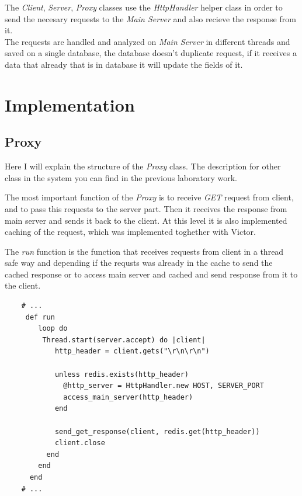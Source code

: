 \documentclass[12pt]{article}
\begin{document}
    The \textit{Client}, \textit{Server}, \textit{Proxy} classes use the \textit{HttpHandler} helper class in order to
    send the necesary requests to the \textit{Main Server} and also recieve the response from it. \\ 

    The requests are handled and analyzed on \textit{Main Server} in different threads and saved on 
    a single database, the database doesn't duplicate request, if it receives a data that already that is in
    database it will update the fields of it. 


  \section{Implementation}

    \subsection{Proxy}

    Here I will explain the structure of the \textit{Proxy} class. The description for 
    other class in the system you can find in the previous laboratory work. 

    The most important function of the \textit{Proxy} is to receive \textit{GET} request
    from client, and to pass this requests to the server part. Then it receives the 
    response from main server and sends it back to the client. At this level it is also 
    implemented caching of the request, which was implemented toghether with Victor.

    The \textit{run} function is the function that receives requests from client in a thread safe way 
    and depending if the requsts was already in the cache to send the cached response or to 
    access main server and cached and send response from it to the client.

    \begin{lstlisting}
    # ...
     def run
        loop do
         Thread.start(server.accept) do |client|
            http_header = client.gets("\r\n\r\n")

            unless redis.exists(http_header)
              @http_server = HttpHandler.new HOST, SERVER_PORT
              access_main_server(http_header)
            end

            send_get_response(client, redis.get(http_header))
            client.close
          end
        end
      end
    # ... 
    \end{lstlisting}
\end{document}
